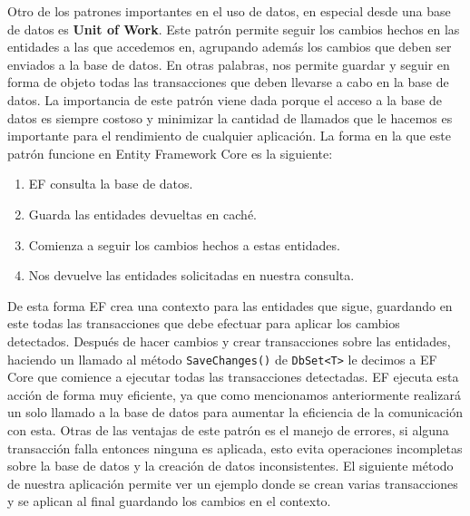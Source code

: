 Otro de los patrones importantes en el uso de datos, en especial desde una base de datos es \textbf{Unit of Work}. Este patrón permite seguir los cambios hechos en las entidades a las que accedemos en, agrupando además los cambios que deben ser enviados a la base de datos. En otras palabras, nos permite guardar y seguir en forma de objeto todas las transacciones que deben llevarse a cabo en la base de datos. La importancia de este patrón viene dada porque el acceso a la base de datos es siempre costoso y minimizar la cantidad de llamados que le hacemos es importante para el rendimiento de cualquier aplicación. La forma en la que este patrón funcione en Entity Framework Core es la siguiente:

\begin{enumerate}
	\item EF consulta la base de datos.
    \item Guarda las entidades devueltas en caché.
    \item Comienza a seguir los cambios hechos a estas entidades.
    \item Nos devuelve las entidades solicitadas en nuestra consulta.
    
\end{enumerate}


De esta forma EF crea una contexto para las entidades que sigue, guardando en este todas las transacciones que debe efectuar para aplicar los cambios detectados. Después de hacer cambios y crear transacciones sobre las entidades, haciendo un llamado al método \lstinline{SaveChanges()} de \lstinline{DbSet<T>} le decimos a EF Core que comience a ejecutar todas las transacciones detectadas. EF ejecuta esta acción de forma muy eficiente, ya que como mencionamos anteriormente realizará un solo llamado a la base de datos para aumentar la eficiencia de la comunicación con esta. Otras de las ventajas de este patrón es el manejo de errores, si alguna transacción falla entonces ninguna es aplicada, esto evita operaciones incompletas sobre la base de datos y la creación de datos inconsistentes. El siguiente método de nuestra aplicación permite ver un ejemplo donde se crean varias transacciones y se aplican al final guardando los cambios en el contexto.

